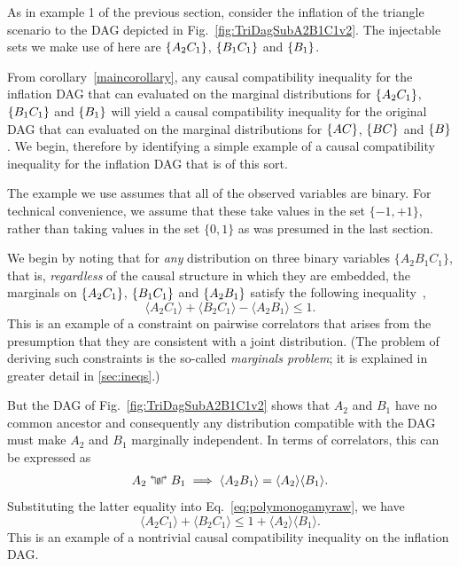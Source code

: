 As in example 1 of the previous section, consider the inflation of the triangle scenario to the DAG depicted in Fig.~\ref{fig:TriDagSubA2B1C1v2}.  
The injectable sets we make use of here are $\left\lbrace A_2 C_1\right\rbrace$, $\left\lbrace B_1 C_1\right\rbrace$ and  $\left\lbrace B_1\right\rbrace$.

From corollary~\ref{maincorollary}, any causal compatibility inequality for the inflation DAG that can evaluated on the marginal distributions for $\left\lbrace A_2 C_1\right\rbrace$, $\left\lbrace B_1 C_1\right\rbrace$ and  $\left\lbrace B_1\right\rbrace$ will yield a causal compatibility inequality for the original DAG that can evaluated on the marginal distributions for $\left\lbrace A C\right\rbrace$, $\left\lbrace B C\right\rbrace$ and  $\left\lbrace B\right\rbrace$.
We begin, therefore by identifying a simple example of a causal compatibility inequality for the inflation DAG that is of this sort. 
 
The example we use assumes that all of the observed variables are binary. For technical convenience, we assume that these take values in the set $\{-1,+1\}$, rather than taking values in the set $\{0,1\}$ as was presumed in the last section. 

We begin by noting that for {\em any} distribution on three binary variables $\{A_2 B_1 C_1\}$, that is, {\em regardless} of the causal structure in which they are embedded, the marginals on $\left\lbrace A_2 C_1\right\rbrace$, $\left\lbrace B_1 C_1\right\rbrace$ and $\left\lbrace A_2 B_1\right\rbrace$ satisfy the following inequality~\cite{pitowsky_boole_1994,Pitowsky1989,kellerer_marginal_1964,leggett_garg_1985,araujo_cycle_2013},
\begin{equation}
	\label{eq:polymonogamyraw}
	\langle A_2 C_1\rangle + \langle B_2 C_1 \rangle - \langle A_2 B_1 \rangle \leq 1.
\end{equation}
This is an example of a constraint on pairwise correlators that arises from the presumption that they are consistent with a joint distribution. (The problem of deriving such constraints is the so-called {\em marginals problem}; it is explained in greater detail in \cref{sec:ineqs}.)

But the DAG of Fig.~\ref{fig:TriDagSubA2B1C1v2} shows that $A_2$ and $B_1$ have no common ancestor and consequently any distribution compatible with the DAG must make $A_2$ and $B_1$ marginally independent.  In terms of correlators, this can be expressed as 
\begin{align}\label{corrfact}
A_2 \mathrel{\mathopen{\Lsh}{\scriptstyle\emptyset}\mathclose{\Rsh}} B_1 \implies  \langle A_2 B_1 \rangle =  \langle A_2\rangle \langle B_1 \rangle.
\end{align}
Substituting the latter equality into Eq.~\eqref{eq:polymonogamyraw}, we have
\begin{equation}
	\langle A_2 C_1\rangle + \langle B_2 C_1 \rangle   \leq 1 + \langle A_2 \rangle \langle B_1\rangle.
\end{equation}
This is an example of a nontrivial causal compatibility inequality on the inflation DAG.  

